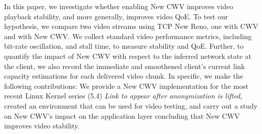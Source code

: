 \documentclass[10pt,sigconf,anonymous]{acmart}
\begin{document}



In this paper, we investigate whether enabling New CWV improves video playback stability, and more generally, improves video QoE. To test our hypothesis, we compare two video streams using TCP New Reno, one with CWV and with New CWV. We collect standard video performance metrics, including bit-rate oscillation, and stall time, to measure stability and QoE. Further, to quantify the impact of New CWV with respect to the inferred network state at the client, we also record the immediate and smoothened client's current link capacity estimations for each delivered video chunk.%
In specific, we make the following contributions: We provide a New CWV implementation for the most recent Linux Kernel series (5.4) \textit{Link to appear after anonymization is lifted}, created an environment that can be used for video testing, and carry out a study on New CWV's impact on the application layer concluding that New CWV improves video stability. 

\end{document}
